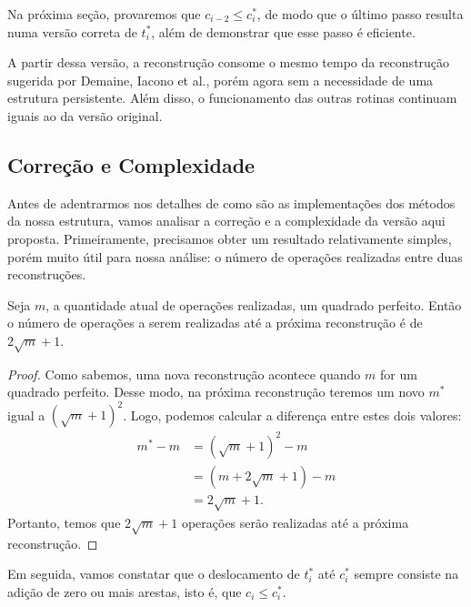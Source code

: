 Na próxima seção, provaremos que $c_{i-2} \leq c^*_i$, de modo que o último passo resulta numa versão correta de $t_i^*$, além de demonstrar que esse passo é eficiente.

A partir dessa versão, a reconstrução consome o mesmo tempo da reconstrução sugerida por Demaine, Iacono et al., porém agora sem a necessidade de uma estrutura persistente. Além disso, o funcionamento das outras rotinas continuam iguais ao da versão original.

\subsection{Correção e Complexidade}
\label{sec:rmsf-complexidade}

Antes de adentrarmos nos detalhes de como são as implementações dos métodos da nossa estrutura, vamos analisar a correção e a complexidade da versão aqui proposta. Primeiramente, precisamos obter um resultado relativamente simples, porém muito útil para nossa análise: o número de operações realizadas entre duas reconstruções.

\begin{lemma}
    \label{coro:amt-op}
    Seja $m$, a quantidade atual de operações realizadas, um quadrado perfeito. Então o número de operações a serem realizadas até a próxima reconstrução é de $2 \sqrt{m} + 1$.
\end{lemma}
\begin{proof}
    Como sabemos, uma nova reconstrução acontece quando $m$ for um quadrado perfeito. Desse modo, na próxima reconstrução teremos um novo $m^*$ igual a $(\sqrt{m} + 1)^2$. Logo, podemos calcular a diferença entre estes dois valores:
    \begin{align*}
        m^* - m & = (\sqrt{m} + 1)^2 - m    \\
                & = (m + 2\sqrt{m} + 1) - m \\
                & = 2\sqrt{m} + 1.
    \end{align*}
    Portanto, temos que $2\sqrt{m} + 1$ operações serão realizadas até a próxima reconstrução.
\end{proof}

Em seguida, vamos constatar que o deslocamento de $t_i^*$ até $c_i^*$ sempre consiste na adição de zero ou mais arestas, isto é, que $c_i \leq c_i^*$.

